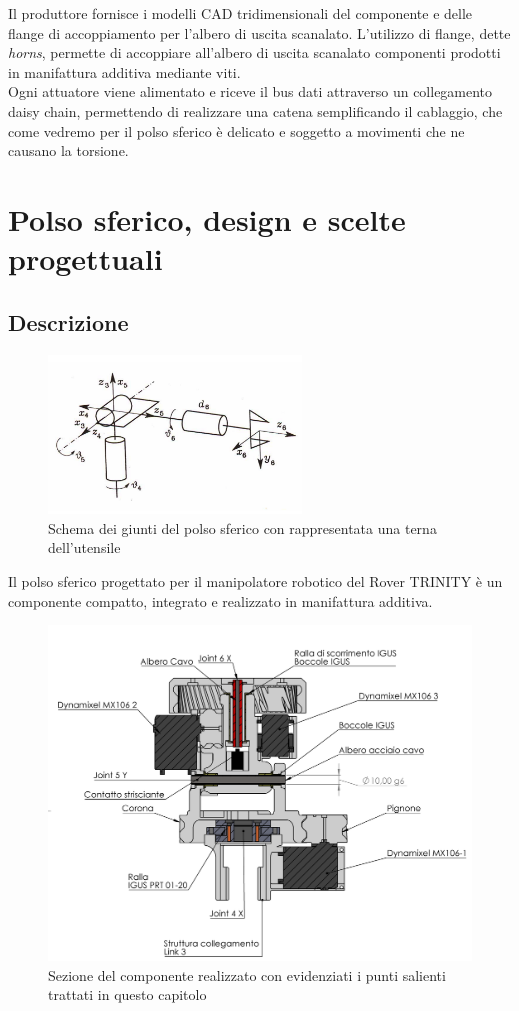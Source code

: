\documentclass[%
corpo=11pt,
twoside,
 stile=classica,
oldstyle,
greek,%
]{toptesi}
\begin{document}
	Il produttore fornisce i modelli CAD tridimensionali del componente e delle flange di accoppiamento per l'albero di uscita scanalato. L'utilizzo di flange, dette \textit{horns}, permette di accoppiare all'albero di uscita scanalato componenti prodotti in manifattura additiva mediante viti. \\
	Ogni attuatore viene alimentato e riceve il bus dati attraverso un collegamento daisy chain, permettendo di realizzare una catena semplificando il cablaggio, che come vedremo per il polso sferico è delicato e soggetto a movimenti che ne causano la torsione. 

		
\chapter{Polso sferico, design e scelte progettuali}
	\section{Descrizione}
	\begin{figure}
		\centering
		\includegraphics[width=0.6\textwidth]{image/sferico.png}
		\caption{Schema dei giunti del polso sferico con rappresentata una terna dell'utensile}
		\label{fig:sferico}
	\end{figure}
	Il polso sferico progettato per il manipolatore robotico del Rover TRINITY è un componente compatto, integrato e realizzato in manifattura additiva. 
	\begin{figure}
		\centering
		\includegraphics[width=1.2\textwidth]{Screen/wristsection.png}
		\caption{Sezione del componente realizzato con evidenziati i punti salienti trattati in questo capitolo}
		\label{fig:disegnosferico}
	\end{figure} 
\end{document}
